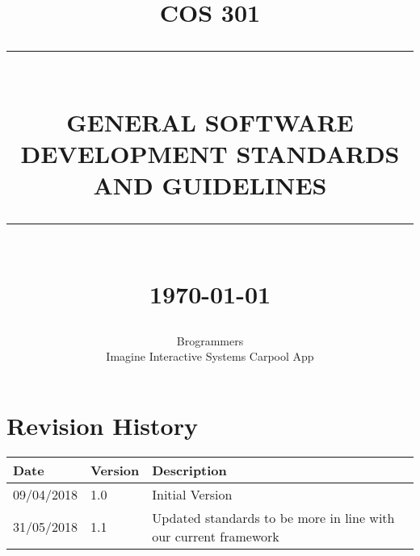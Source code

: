 \documentclass[12pt]{report}
\newcommand{\HRule}[1]{\rule{\linewidth}{#1}}
\begin{document}
\title{ \normalsize \textsc{COS 301}
        \\ [2.0cm]
        \HRule{0.5pt} \\
        \LARGE \textbf{\uppercase{General Software Development Standards and Guidelines}}
        \HRule{2pt} \\ [0.5cm]
        \normalsize \today \vspace*{5\baselineskip}}

\date{}

\author{
        Brogrammers \\
        Imagine Interactive Systems Carpool App }



\maketitle


\section*{Revision History}

    \begin{center}
		
        \begin{tabular}{ | m{6em} | m{4em} | m{30em} | }
        
        \hline
         \textbf{Date} & \textbf{Version} & \textbf{Description} \\        
         \hline
         09/04/2018 & 1.0 & Initial Version \\ 
         \hline
         31/05/2018 & 1.1 & Updated standards to be more in line with our current framework \\ 
         \hline
         
        \end{tabular}
        
    \end{center}
    \newpage




\tableofcontents
\newpage

\sectionfont{\scshape}
\end{document}
